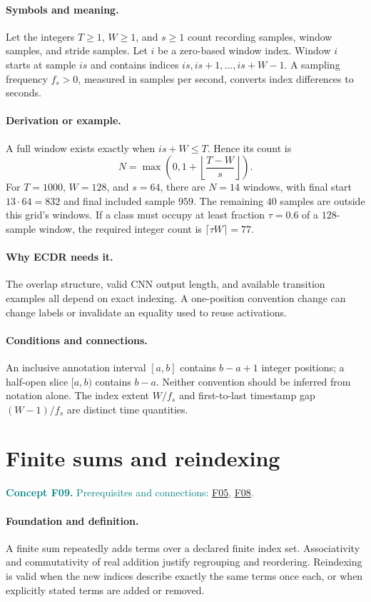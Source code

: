 \documentclass[11pt,a4paper]{article}
\newcommand{\conceptid}{Front matter}
\newcommand{\concept}[3]{\clearpage\renewcommand{\conceptid}{#1}%
\section{#2}\label{concept:#1}%
\textcolor{teal}{\textbf{Concept #1.} Prerequisites and connections: #3.}\par
\typeout{ECDR-CONCEPT-START #1 PAGE=\thepage}}
\begin{document}
\paragraph{Symbols and meaning.}
Let the integers $T\ge1$, $W\ge1$, and $s\ge1$ count recording samples,
window samples, and stride samples. Let $i$ be a zero-based window index.
Window $i$ starts at sample $is$ and contains indices
$is,is+1,\ldots,is+W-1$. A sampling frequency $f_s>0$, measured in
samples per second, converts index differences to seconds.
\paragraph{Derivation or example.}
A full window exists exactly when $is+W\le T$. Hence its count is
\[
 N=\max\!\left(0,1+\left\lfloor\frac{T-W}{s}\right\rfloor\right).
\]
For $T=1000$, $W=128$, and $s=64$, there are $N=14$ windows, with
final start $13\cdot64=832$ and final included sample $959$.
The remaining $40$ samples are outside this grid's windows. If a class
must occupy at least fraction $\tau=0.6$ of a $128$-sample window,
the required integer count is $\lceil\tau W\rceil=77$.
\paragraph{Why ECDR needs it.}
The overlap structure, valid CNN output length, and available transition
examples all depend on exact indexing. A one-position convention change
can change labels or invalidate an equality used to reuse activations.
\paragraph{Conditions and connections.}
An inclusive annotation interval $[a,b]$ contains $b-a+1$ integer
positions; a half-open slice $[a,b)$ contains $b-a$. Neither convention
should be inferred from notation alone. The index extent $W/f_s$ and
first-to-last timestamp gap $(W-1)/f_s$ are distinct time quantities.
\par\label{endconcept:F08}

\concept{F09}{Finite sums and reindexing}{\hyperref[concept:F05]{F05}, \hyperref[concept:F08]{F08}}
\paragraph{Foundation and definition.}
A finite sum repeatedly adds terms over a declared finite index set.
Associativity and commutativity of real addition justify regrouping and
reordering. Reindexing is valid when the new indices describe exactly the
same terms once each, or when explicitly stated terms are added or removed.
\end{document}
